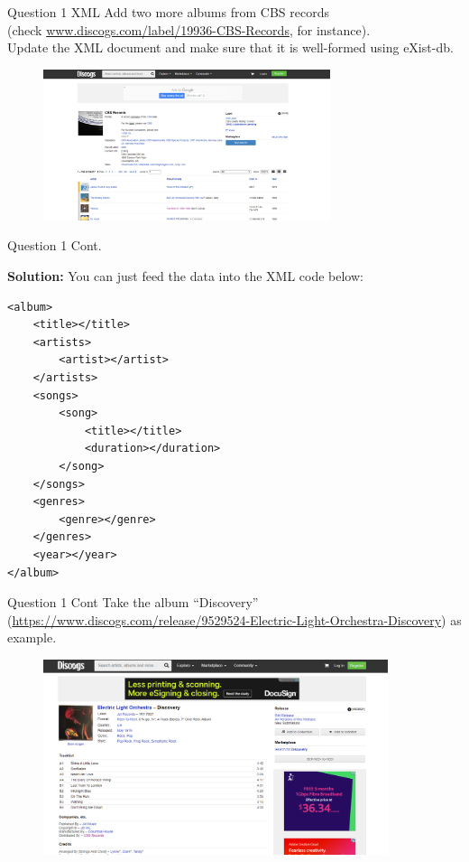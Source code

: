 \begin{frame}[fragile]{Question 1 XML}
	Add two more albums from CBS records\\
	(check \url{www.discogs.com/label/19936-CBS-Records}, for instance).\\
	Update the XML document and make sure that it is well-formed using eXist-db.
	\vspace{10pt}
	
	\begin{figure}
		\includegraphics[width=0.75\textwidth,frame]{4221-t7/cbs_record.png}
	\end{figure}\vspace{-10pt}
\end{frame}

\begin{frame}[fragile]{Question 1 Cont.}
	
\textbf{Solution:}
You can just feed the data into the XML code below:

\begin{lstlisting}[style=xml-small]
<album>
	<title></title>
	<artists>
		<artist></artist>
	</artists>
	<songs>
		<song>
			<title></title>
			<duration></duration>
		</song>
	</songs>
	<genres>
		<genre></genre>
	</genres>
	<year></year>
</album>
\end{lstlisting}
\end{frame}

\begin{frame}[fragile]{Question 1 Cont}
Take the album ``Discovery'' (\url{https://www.discogs.com/release/9529524-Electric-Light-Orchestra-Discovery}) as example.
\vspace{3pt}
	
\begin{figure}
	\includegraphics[width=0.9\textwidth,frame]{4221-t7/sample_album.png}
\end{figure}\vspace{-10pt}
\end{frame}

